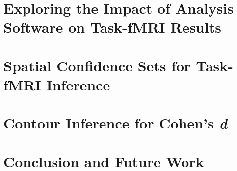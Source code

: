 \documentclass[11pt,a4paper]{report}      %
\begin{document}
\chapter{Exploring the Impact of Analysis Software on Task-fMRI Results}


\chapter{Spatial Confidence Sets for Task-fMRI Inference}


\chapter{Contour Inference for Cohen's \textit{d}}


\chapter{Conclusion and Future Work }
%
%

%  
%  



\end{document}
